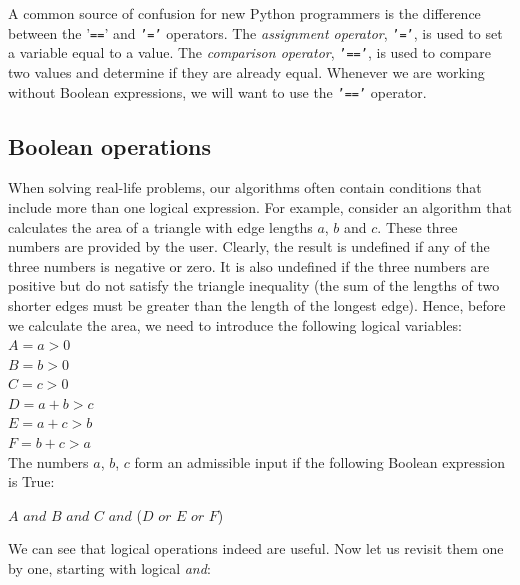 \documentclass[article,A4,12pt]{llncs}
\begin{document}
\begin{gbox}
A common source of confusion for new Python programmers is the difference between the '{\tt ==}' and {\tt '='} operators. The {\em assignment operator}, {\tt '='}, is used to set a variable equal to a value. The {\em comparison operator}, {\tt '=='}, is used to compare two values and determine if they are already equal. Whenever we are working without Boolean expressions, we will want to use the {\tt '=='} operator.
\end{gbox}

\subsection{Boolean operations}\label{subsec:boolop}

When solving real-life problems, our algorithms often 
contain conditions that include more than one logical 
expression. For example, consider an algorithm that 
calculates the area of a triangle with edge
lengths $a$, $b$ and $c$. These three numbers are provided by 
the user. Clearly, the result is undefined if any of the three
numbers is negative or zero. It is also undefined if 
the three numbers are positive but do not satisfy the 
triangle inequality (the sum of the lengths of two shorter edges 
must be greater than the length of the longest edge).
Hence, before we calculate the area, we need to introduce the 
following logical variables:\\

\noindent
$A = a > 0$\\
$B = b > 0$\\
$C = c > 0$\\
$D = a + b > c$\\
$E = a + c > b$\\
$F = b + c > a$\\

\noindent
The numbers $a$, $b$, $c$ form an admissible input if the following 
Boolean expression is True:\\

\noindent
\begin{center}
$A$ $and$ $B$ $and$ $C$ $and$ ($D$ $or$ $E$ $or$ $F$) \\
\end{center}

\noindent
We can see that logical operations indeed are useful. Now let us revisit them 
one by one, starting with logical {\em and}:\\
\end{document}
